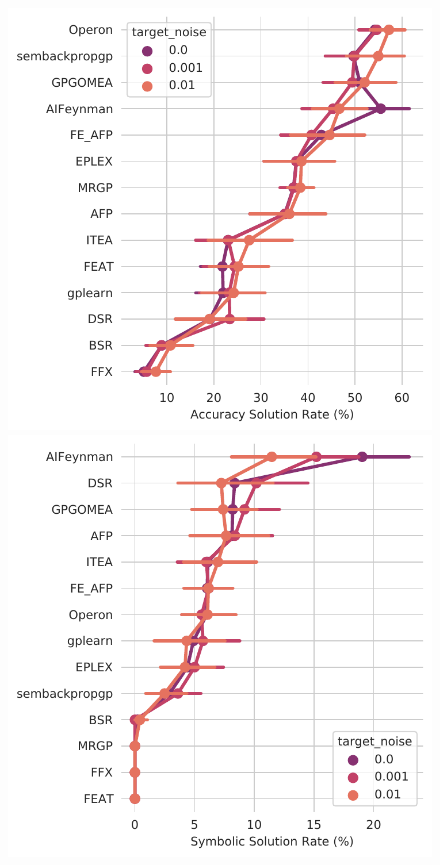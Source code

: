 \begin{figure}
    \centering
    \begin{minipage}{0.49\textwidth}
        \includegraphics[width=\textwidth]{figs/results_sym_data/cat-pointplot-Accuracy-Solution-Rate-(pct)-by-Algorithm.pdf}
    \end{minipage}
    \begin{minipage}{0.49\textwidth}
        \includegraphics[width=\textwidth]{figs/results_sym_data/cat-pointplot-Symbolic-Solution-Rate-(pct)-by-Algorithm.pdf}

\end{minipage}
\end{figure}

